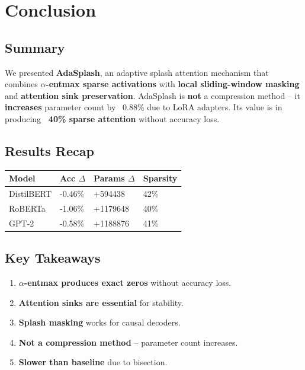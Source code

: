 
\section{Conclusion}

\subsection{Summary}

We presented \textbf{AdaSplash}, an adaptive splash attention mechanism that 
combines \textbf{$\alpha$-entmax sparse activations} with \textbf{local sliding-window masking} 
and \textbf{attention sink preservation}. AdaSplash is \textbf{not} a compression 
method -- it \textbf{increases} parameter count by ~0.88\% due to LoRA 
adapters. Its value is in producing \textbf{~40\% sparse attention} without 
accuracy loss.

\subsection{Results Recap}

\begin{table}[H]
\centering
\small
\begin{tabular}{llll}
\toprule
\textbf{Model} & \textbf{Acc $\Delta$} & \textbf{Params $\Delta$} & \textbf{Sparsity} \\
\midrule
DistilBERT & -0.46\% & +594438 & 42\% \\
RoBERTa & -1.06\% & +1179648 & 40\% \\
GPT-2 & -0.58\% & +1188876 & 41\% \\
\bottomrule
\end{tabular}
\end{table}

\subsection{Key Takeaways}

\begin{enumerate}
\item \textbf{$\alpha$-entmax produces exact zeros} without accuracy loss.
\item \textbf{Attention sinks are essential} for stability.
\item \textbf{Splash masking} works for causal decoders.
\item \textbf{Not a compression method} -- parameter count increases.
\item \textbf{Slower than baseline} due to bisection.

\end{enumerate}
